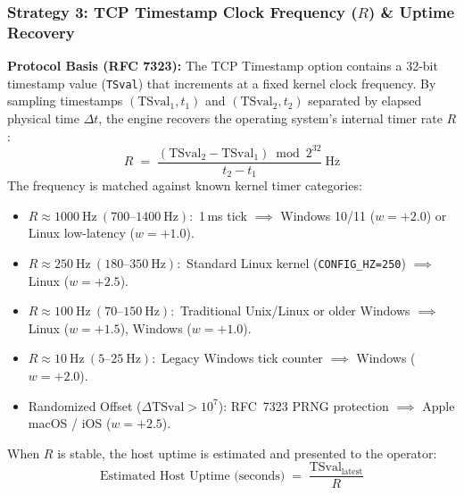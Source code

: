 \subsubsection{Strategy 3: TCP Timestamp Clock Frequency (\texorpdfstring{$R$}{R}) \& Uptime Recovery}
\textbf{Protocol Basis (RFC 7323):} The TCP Timestamp option contains a 32-bit timestamp value
(\texttt{TSval}) that increments at a fixed kernel clock frequency. By sampling timestamps
$(\mathrm{TSval}_1, t_1)$ and $(\mathrm{TSval}_2, t_2)$ separated by elapsed physical time $\Delta t$,
the engine recovers the operating system's internal timer rate $R$:
\begin{equation}
R \;=\; \frac{(\mathrm{TSval}_2 - \mathrm{TSval}_1) \bmod 2^{32}}{t_2 - t_1} \ \text{Hz}
\end{equation}
The frequency is matched against known kernel timer categories:
\begin{itemize}
    \item $R \approx 1000 \ \text{Hz} \ (700\text{--}1400 \ \text{Hz}):$ 1\,ms tick $\implies$ Windows 10/11 ($w = +2.0$) or Linux low-latency ($w = +1.0$).
    \item $R \approx 250 \ \text{Hz} \ (180\text{--}350 \ \text{Hz}):$ Standard Linux kernel (\texttt{CONFIG\_HZ=250}) $\implies$ Linux ($w = +2.5$).
    \item $R \approx 100 \ \text{Hz} \ (70\text{--}150 \ \text{Hz}):$ Traditional Unix/Linux or older Windows $\implies$ Linux ($w = +1.5$), Windows ($w = +1.0$).
    \item $R \approx 10 \ \text{Hz} \ (5\text{--}25 \ \text{Hz}):$ Legacy Windows tick counter $\implies$ Windows ($w = +2.0$).
    \item Randomized Offset ($\Delta\mathrm{TSval} > 10^7$): RFC~7323 PRNG protection $\implies$ Apple macOS / iOS ($w = +2.5$).
\end{itemize}
When $R$ is stable, the host uptime is estimated and presented to the operator:
\begin{equation}
\text{Estimated Host Uptime (seconds)} \;=\; \frac{\mathrm{TSval}_{\text{latest}}}{R}
\end{equation}

